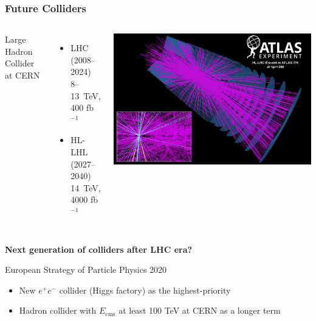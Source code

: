 \documentclass[aspectratio=169]{beamer}
\newcommand{\bluetext}[1]{%
  \textcolor{myBlue}{#1}
}
\begin{document}
\begin{frame}
  \frametitle{Future Colliders}

  \begin{columns}[c]

    \bluetext{Large Hadron Collider at CERN}
    \begin{itemize}
    \item LHC (2008--2024)\\
     8--13~TeV, 400 fb$^{-1}$
    \item HL-LHL (2027--2040)\\
     14~TeV, 4000 fb$^{-1}$
    \end{itemize}


    \begin{center}
      \includegraphics[width=0.75\linewidth]{figures/HL-LHC-tt.png} \\
    \end{center}
  \end{columns}
  \pause%

  \vspace{2ex}
  \bluetext{{\bf Next generation of colliders after LHC era?}} \\
  \vspace{2ex}

  \bluetext{European Strategy of Particle Physics 2020} \\
  \begin{itemize}
    \item New $e^+e^-$ collider (Higgs factory) as the highest-priority
    \item Hadron collider with $E_{\mathrm{cms}}$ at least 100 TeV at CERN as
          a longer term
  \end{itemize}
\end{frame}
\end{document}
